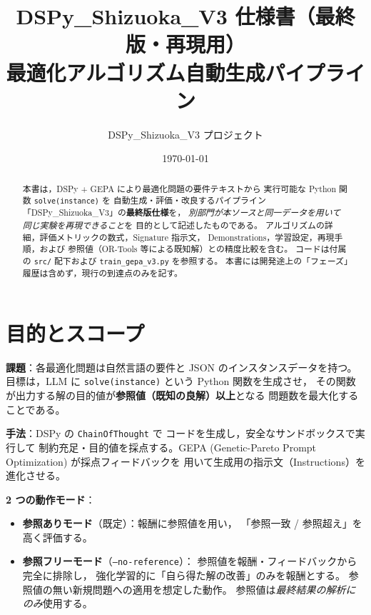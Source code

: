 \documentclass[uplatex,dvipdfmx,a4paper,11pt]{jsarticle}
\title{DSPy\_Shizuoka\_V3 仕様書（最終版・再現用）\\
最適化アルゴリズム自動生成パイプライン}
\author{DSPy\_Shizuoka\_V3 プロジェクト}
\date{\today}
\begin{document}
\maketitle

\begin{abstract}
本書は，DSPy + GEPA により最適化問題の要件テキストから
実行可能な Python 関数 \texttt{solve(instance)} を
自動生成・評価・改良するパイプライン
「DSPy\_Shizuoka\_V3」の\textbf{最終版仕様}を，
\emph{別部門が本ソースと同一データを用いて同じ実験を再現できること}を
目的として記述したものである。
アルゴリズムの詳細，評価メトリックの数式，Signature 指示文，
Demonstrations，学習設定，再現手順，および
参照値（OR-Tools 等による既知解）との精度比較を含む。
コードは付属の \texttt{src/} 配下および \texttt{train\_gepa\_v3.py} を参照する。
本書には開発途上の「フェーズ」履歴は含めず，現行の到達点のみを記す。
\end{abstract}

\tableofcontents

\section{目的とスコープ}\label{sec:scope}

\textbf{課題}：各最適化問題は自然言語の要件と
JSON のインスタンスデータを持つ。目標は，LLM に
\texttt{solve(instance)} という Python 関数を生成させ，
その関数が出力する解の目的値が\textbf{参照値（既知の良解）以上}となる
問題数を最大化することである。

\textbf{手法}：DSPy の \texttt{ChainOfThought} で
コードを生成し，安全なサンドボックスで実行して
制約充足・目的値を採点する。GEPA
(Genetic-Pareto Prompt Optimization) が採点フィードバックを
用いて生成用の指示文（Instructions）を進化させる。

\textbf{2 つの動作モード}：
\begin{itemize}
  \item \textbf{参照ありモード}（既定）：報酬に参照値を用い，
    「参照一致 / 参照超え」を高く評価する。
  \item \textbf{参照フリーモード}（\texttt{--no-reference}）：
    参照値を報酬・フィードバックから完全に排除し，
    強化学習的に「自ら得た解の改善」のみを報酬とする。
    参照値の無い新規問題への適用を想定した動作。
    参照値は\emph{最終結果の解析にのみ}使用する。
\end{itemize}
\end{document}
